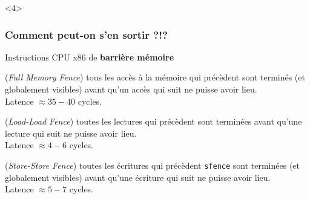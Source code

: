 \documentclass[xcolor={x11names,svgnames}]{beamer}
\begin{document}
\begin{frame}[fragile, label=tso_mp]
  \begin{uncoverenv}<4>  
    \begin{center}
    \end{center}
  \end{uncoverenv}
\end{frame}


\begin{frame}[label=mfences]
  \frametitle{Comment peut-on s'en sortir ?!?}

  \begin{alertblock}{Instructions CPU x86 de \textbf{barrière mémoire}}
    \begin{description}\small
  
    \item[\texttt{mfence}] (\textit{Full Memory Fence}) tous les accès à la
      mémoire qui précèdent sont terminés (et globalement visibles) avant qu'un
      accès  qui suit ne puisse avoir lieu. \\
      Latence $\approx 35-40$ cycles.

    \item[\texttt{lfence}] (\textit{Load-Load Fence}) toutes les lectures qui
      précèdent sont terminées avant qu'une lecture qui suit ne puisse avoir
      lieu. \\
      Latence $\approx 4-6$ cycles.

\item[\texttt{sfence}] (\textit{Store-Store Fence}) toutes les
  écritures qui précèdent \texttt{sfence} sont terminées (et
  globalement visibles) avant qu'une écriture qui suit
  ne puisse avoir lieu. \\
  Latence $\approx 5-7$ cycles.
\end{description}
\end{alertblock}

\end{frame}
\end{document}
